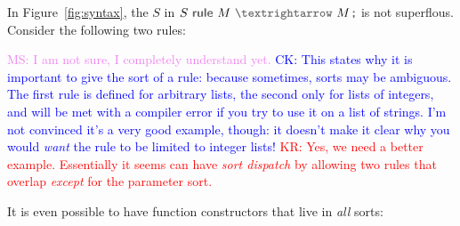 \documentclass[letterpaper,11pt]{article}
\newcommand{\CK}[1]{\textcolor{blue}{CK: #1}}
\newcommand{\KR}[1]{\textcolor{red}{KR: #1}}
\newcommand{\MS}[1]{\textcolor{violet}{MS: #1}}
\begin{document}
In Figure~\ref{fig:syntax}, the $S$ in $S~\kw{rule}~M~\kw{$→$}~M\,\kw;$ is not superflous. Consider
the following two rules:
\MS{I am not sure, I completely understand yet.}
\CK{This states why it is important to give the sort of a rule: because
sometimes, sorts may be ambiguous.  The first rule is defined for arbitrary
lists, the second only for lists of integers, and will be met with a
compiler error if you try to use it on a list of strings.  I'm not convinced
it's a very good example, though: it doesn't make it clear why you would
\emph{want} the rule to be limited to integer lists!}
\KR{Yes, we need a better example. Essentially it seems \hax can have \emph{sort dispatch} by
  allowing two rules that overlap \emph{except} for the parameter sort.}

It is even possible to have function constructors that live in \emph{all} sorts:
\end{document}
